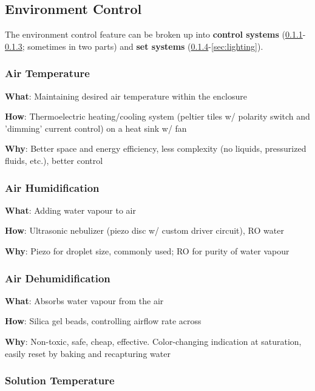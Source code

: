 \documentclass{report}
\begin{document}
\newpage

\subsection{Environment Control}
\label{sec:environment}

The environment control feature can be broken up into \textbf{control systems} (\ref{sec:airtemp}-\ref{sec:dehum}; sometimes in two parts) and \textbf{set systems} (\ref{sec:watertemp}-\ref{sec:lighting}).

\subsubsection{Air Temperature}
\label{sec:airtemp}

\textbf{What}: Maintaining desired air temperature within the enclosure

\textbf{How}: Thermoelectric heating/cooling system (peltier tiles w/ polarity switch and 'dimming' current control) on a heat sink w/ fan

\textbf{Why}: Better space and energy efficiency, less complexity (no liquids, pressurized fluids, etc.), better control

\subsubsection{Air Humidification}
\label{sec:airhum}

\textbf{What}: Adding water vapour to air

\textbf{How}: Ultrasonic nebulizer (piezo disc w/ custom driver circuit), RO water

\textbf{Why}: Piezo for droplet size, commonly used; RO for purity of water vapour

\subsubsection{Air Dehumidification}
\label{sec:dehum}

\textbf{What}: Absorbs water vapour from the air

\textbf{How}: Silica gel beads, controlling airflow rate across

\textbf{Why}: Non-toxic, safe, cheap, effective. Color-changing indication at saturation, easily reset by baking and recapturing water

\subsubsection{Solution Temperature}
\label{sec:watertemp}
\end{document}
